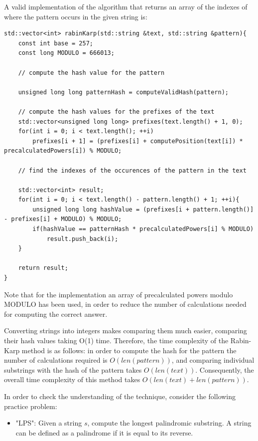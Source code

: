 \documentclass[letterpaper]{article}
\begin{document}
A valid implementation of the algorithm that returns an array of the indexes of where the pattern occurs in the given string is: 

\begin{lstlisting}
std::vector<int> rabinKarp(std::string &text, std::string &pattern){
    const int base = 257;
    const long MODULO = 666013;

    // compute the hash value for the pattern

    unsigned long long patternHash = computeValidHash(pattern);

    // compute the hash values for the prefixes of the text
    std::vector<unsigned long long> prefixes(text.length() + 1, 0);
    for(int i = 0; i < text.length(); ++i)
        prefixes[i + 1] = (prefixes[i] + computePosition(text[i]) * precalculatedPowers[i]) % MODULO;

    // find the indexes of the occurences of the pattern in the text

    std::vector<int> result;
    for(int i = 0; i < text.length() - pattern.length() + 1; ++i){
        unsigned long long hashValue = (prefixes[i + pattern.length()] - prefixes[i] + MODULO) % MODULO;
        if(hashValue == patternHash * precalculatedPowers[i] % MODULO)
            result.push_back(i);
    }

    return result;
}
\end{lstlisting}

Note that for the implementation an array of precalculated powers modulo MODULO has been used, in order to reduce the number of calculations needed for computing the correct answer.

Converting strings into integers makes comparing them much easier, comparing their hash values taking O(1) time. Therefore, the time complexity of the Rabin-Karp method is as follows: in order to compute the hash for the pattern the number of calculations required is $O(len(pattern))$, and comparing individual substrings with the hash of the pattern takes $O(len(text))$. Consequently, the overall time complexity of this method takes $O(len(text) + len(pattern))$. 

In order to check the understanding of the technique, consider the following practice problem:

\begin{itemize}
    \item "LPS": Given a string $s$, compute the longest palindromic substring. A string can be defined as a palindrome if it is equal to its reverse.
\end{itemize}
\end{document}

